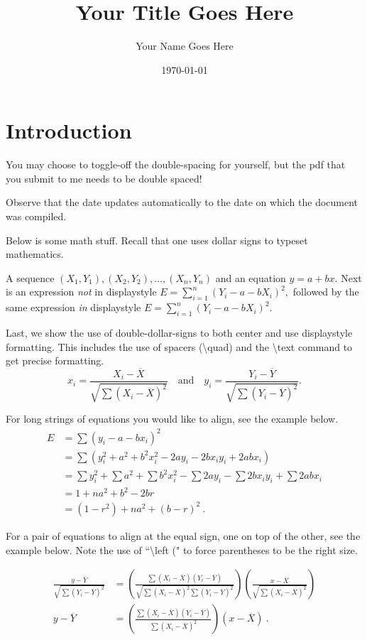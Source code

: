 \documentclass{article}
\begin{document}
\title{Your Title Goes Here}
\author{Your Name Goes Here}
\date{\today}
\maketitle
\thispagestyle{empty}

\section{Introduction}\label{intro}

You may choose to toggle-off the double-spacing for yourself, but the pdf that you submit to me needs to be double spaced! 

Observe that the date updates automatically to the date on which the document was compiled.

Below is some math stuff. Recall that one uses dollar signs to typeset mathematics. 

A sequence $(X_1, Y_1), (X_2,Y_2),\ldots, (X_n, Y_n)$ and an equation $y = a + bx.$ Next is an expression \emph{not} in displaystyle 
$E = \sum_{i=1}^n (Y_i - a - bX_i)^2,$ followed by the same expression \emph{in} displaystyle $\displaystyle{E = \sum_{i=1}^n (Y_i - a - bX_i)^2}.$

Last, we show the use of double-dollar-signs to both center and use displaystyle formatting. This includes the use of spacers (\textbackslash quad) and the \textbackslash text command to get precise formatting.
$$
x_i = \frac{X_i - \overline{X}}{\sqrt{\sum (X_i - \overline{X})^2}}\quad\text{and}\quad
y_i = \frac{Y_i - \overline{Y}}{\sqrt{\sum (Y_i - \overline{Y})^2}}.
$$

For long strings of equations you would like to align, see the example below.
\begin{align*}
E &= \sum (y_i - a - bx_i)^2 \\
&= \sum (y_i^2 + a^2 + b^2 x_i^2 - 2ay_i - 2bx_iy_i + 2abx_i) \\
&= \sum y_i^2 + \sum a^2 + \sum b^2 x_i^2 
 - \sum 2ay_i - \sum 2bx_iy_i + \sum 2abx_i \\
&= 1 + na^2 + b^2 - 2br \\
&= (1-r^2) + na^2 + (b - r)^2\ .
\end{align*}

For a pair of equations to align at the equal sign, one on top of the other, see the example below. Note the use of ``\textbackslash left (" to force parentheses to be the right size.

\begin{align*}
\frac{y - \overline{Y}}{\sqrt{\sum (Y_i - \overline{Y})^2}}
&= \left(
     \frac{\sum (X_i - \overline{X}) (Y_i - \overline{Y})}
          {\sqrt{\sum (X_i - \overline{X})^2 \sum (Y_i - \overline{Y})^2}}
   \right)
   \left(
     \frac{x - \overline{X}}
          {\sqrt{\sum (X_i - \overline{X})^2}}
   \right)\\
y - \overline{Y} &=
\left(
     \frac{\sum (X_i - \overline{X}) (Y_i - \overline{Y})}
          {\sum (X_i - \overline{X})^2}
   \right)
   (x - \overline{X})\ .
\end{align*}
\end{document}
